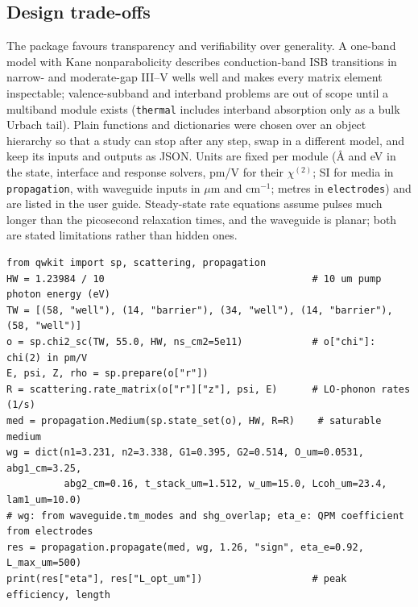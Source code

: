 \documentclass[11pt]{article}
\newcommand{\chitwo}{\chi^{(2)}}
\newcommand{\code}[1]{\texttt{#1}}
\begin{document}
\subsection{Design trade-offs}
The package favours transparency and verifiability over generality. A one-band model with Kane nonparabolicity describes conduction-band ISB transitions in narrow- and moderate-gap III--V wells well \cite{Nelson1987,Sirtori1994} and makes every matrix element inspectable; valence-subband and interband problems are out of scope until a multiband module exists (\code{thermal} includes interband absorption only as a bulk Urbach tail). Plain functions and dictionaries were chosen over an object hierarchy so that a study can stop after any step, swap in a different model, and keep its inputs and outputs as JSON. Units are fixed per module (\AA{} and eV in the state, interface and response solvers, pm/V for their $\chitwo$; SI for media in \code{propagation}, with waveguide inputs in $\mu$m and cm$^{-1}$; metres in \code{electrodes}) and are listed in the user guide. Steady-state rate equations assume pulses much longer than the picosecond relaxation times, and the waveguide is planar; both are stated limitations rather than hidden ones.

\begin{lstlisting}[float=t,caption={From layers to conversion efficiency (abridged from \code{docs/examples.py}).},captionpos=b,label=lst:ex]
from qwkit import sp, scattering, propagation
HW = 1.23984 / 10                                    # 10 um pump photon energy (eV)
TW = [(58, "well"), (14, "barrier"), (34, "well"), (14, "barrier"), (58, "well")]
o = sp.chi2_sc(TW, 55.0, HW, ns_cm2=5e11)            # o["chi"]: chi(2) in pm/V
E, psi, Z, rho = sp.prepare(o["r"])
R = scattering.rate_matrix(o["r"]["z"], psi, E)      # LO-phonon rates (1/s)
med = propagation.Medium(sp.state_set(o), HW, R=R)    # saturable medium
wg = dict(n1=3.231, n2=3.338, G1=0.395, G2=0.514, O_um=0.0531, abg1_cm=3.25,
          abg2_cm=0.16, t_stack_um=1.512, w_um=15.0, Lcoh_um=23.4, lam1_um=10.0)
# wg: from waveguide.tm_modes and shg_overlap; eta_e: QPM coefficient from electrodes
res = propagation.propagate(med, wg, 1.26, "sign", eta_e=0.92, L_max_um=500)
print(res["eta"], res["L_opt_um"])                   # peak efficiency, length
\end{lstlisting}
\end{document}
